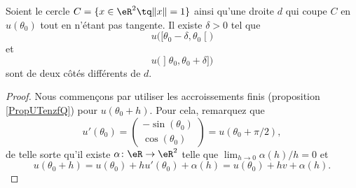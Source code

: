 \begin{lemma}	\label{LEMooPNBKooZAFNph}
	Soient le cercle \( C=\{ x\in \eR^2\tq \| x \|=1 \}\) ainsi qu'une droite \( d\) qui coupe \( C\) en \( u(\theta_0)\) tout en n'étant pas tangente. Il existe \( \delta>0\) tel que
	\begin{equation}
		u\big( \mathopen[ \theta_0-\delta,\theta_0\mathclose[ \big)
	\end{equation}
	et
	\begin{equation}
		u\big( \mathopen] \theta_0,\theta_0+\delta\mathclose] \big)
	\end{equation}
	sont de deux côtés différents de \( d\).
\end{lemma}


\begin{proof}
	Nous commençons par utiliser les accroissements finis (proposition \ref{PropUTenzfQ}) pour \( u(\theta_0+h)\). Pour cela, remarquez que
	\begin{equation}
		u'(\theta_0)=\begin{pmatrix}
			-\sin(\theta_0) \\
			\cos(\theta_0)
		\end{pmatrix}=u(\theta_0+\pi/2),
	\end{equation}
	de telle sorte qu'il existe \(\alpha \colon \eR\to \eR^2  \) telle que \( \lim_{h\to 0}\alpha(h)/h=0\) et
	\begin{equation}
		u(\theta_0+h)=u(\theta_0)+hu'(\theta_0)+\alpha(h)=u(\theta_0)+hv+\alpha(h).
	\end{equation}


\end{proof}
